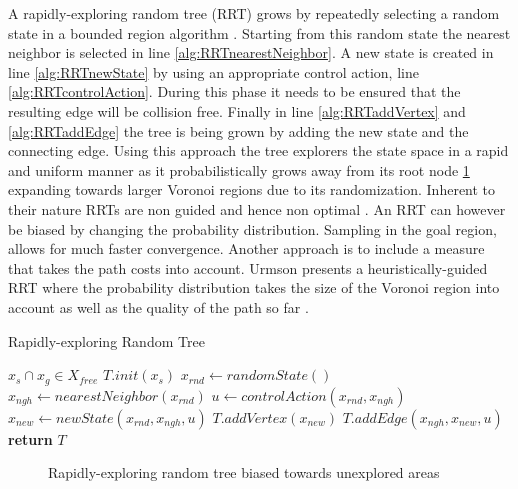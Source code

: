 A rapidly-exploring random tree (RRT) grows by repeatedly selecting a random state in a bounded region algorithm . Starting from this random state the nearest neighbor is selected in line \ref{alg:RRTnearestNeighbor}. A new state is created in line \ref{alg:RRTnewState} by using an appropriate control action, line \ref{alg:RRTcontrolAction}. During this phase it needs to be ensured that the resulting edge will be collision free. Finally in line \ref{alg:RRTaddVertex} and \ref{alg:RRTaddEdge} the tree is being grown by adding the new state and the connecting edge. Using this approach the tree explorers the state space in a rapid and uniform manner as it probabilistically grows away from its root node \ref{fig:RRT} expanding towards larger Voronoi regions due to its randomization. Inherent to their nature RRTs are non guided and hence non optimal \cite{Lavalle.1999}. An RRT can however be biased by changing the probability distribution. Sampling in the goal region, allows for much faster convergence. Another approach is to include a measure that takes the path costs into account. Urmson presents a heuristically-guided RRT where the probability distribution takes the size of the Voronoi region into account as well as the quality of the path so far \cite{Urmson.2003}.

\begin{algorithm}
    \caption{Rapidly-exploring Random Tree}\label{alg:RRT}
    \begin{algorithmic}[1]
        \Require $x_s \cap x_g \in X_{free}$
        \State $T.init(x_s)$
            \State $x_{rnd} \gets randomState()$ \label{alg:RRTrandomState}
            \State $x_{ngh} \gets nearestNeighbor(x_{rnd})$ \label{alg:RRTnearestNeighbor}
            \State $u \gets controlAction(x_{rnd}, x_{ngh})$ \label{alg:RRTcontrolAction}
            \State $x_{new} \gets newState(x_{rnd}, x_{ngh}, u)$ \label{alg:RRTnewState}
            \State $T.addVertex(x_{new})$ \label{alg:RRTaddVertex}
            \State $T.addEdge(x_{ngh}, x_{new}, u)$ \label{alg:RRTaddEdge}
        \EndWhile
        \State \textbf{return} $T$
    \end{algorithmic}
\end{algorithm}

\begin{figure}[h]
    \caption{Rapidly-exploring random tree biased towards unexplored areas}
    \label{fig:RRT}
\end{figure}

